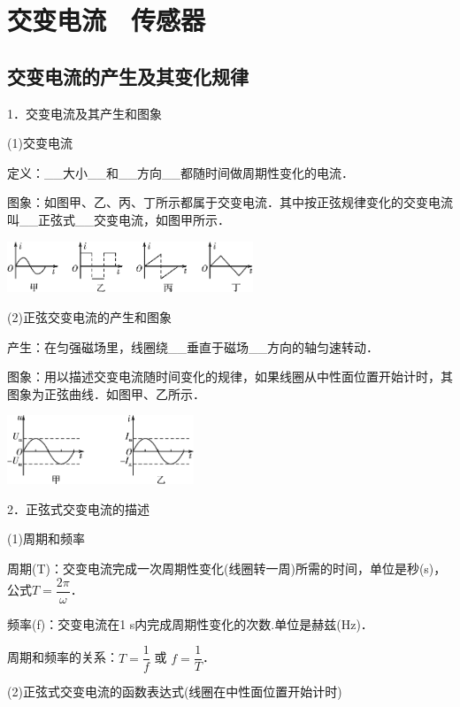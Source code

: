 \chapter{交变电流　传感器}
\section{交变电流的产生及其变化规律}

1．交变电流及其产生和图象

(1)交变电流

定义：\_\_大小\_\_和\_\_方向\_\_都随时间做周期性变化的电流．

图象：如图甲、乙、丙、丁所示都属于交变电流．其中按正弦规律变化的交变电流叫\_\_正弦式\_\_交变电流，如图甲所示．

\begin{center}\includegraphics[width=2.89653in,height=0.60347in]{media/image436.png}\end{center}

(2)正弦交变电流的产生和图象

产生：在匀强磁场里，线圈绕\_\_垂直于磁场\_\_方向的轴匀速转动．

图象：用以描述交变电流随时间变化的规律，如果线圈从中性面位置开始计时，其图象为正弦曲线．如图甲、乙所示．

\begin{center}\includegraphics[width=2.19792in,height=0.81111in]{media/image437.png}\end{center}

2．正弦式交变电流的描述

(1)周期和频率

周期(T)：交变电流完成一次周期性变化(线圈转一周)所需的时间，单位是秒(s)，公式$T=\dfrac{2 \pi}{\omega}$．

频率(f)：交变电流在1 s内完成周期性变化的次数.单位是赫兹(Hz)．

周期和频率的关系：$T=\dfrac{1}{f}$ 或 $f=\dfrac{1}{T}$．

(2)正弦式交变电流的函数表达式(线圈在中性面位置开始计时)

